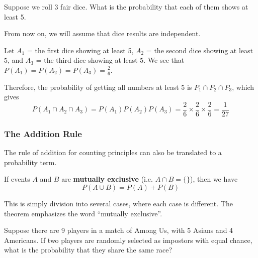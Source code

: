  
\begin{frame}[t]
\begin{ex} 
Suppose we roll 3 fair dice. What is the probability that each of them shows at least 5.
\end{ex} 
\begin{sol}
From now on, we will assume that dice results are independent.
\medskip
 
 Let $A_1$ = the first dice showing at least 5, $A_2$ = the second dice showing at least $5$, and $A_3$ = the third dice showing at least $5$. We see that $P(A_1) = P(A_2) = P(A_3) = \frac{2}{6}$. 

\medskip Therefore, the probability of getting all numbers at least 5 is $P_1 \cap P_2 \cap P_3$, which gives
\[P(A_1 \cap A_2 \cap A_3) = P(A_1) P(A_2) P(A_3) = \frac{2}{6} \times \frac{2}{6} \times \frac{2}{6} = \frac{1}{27}\]
\end{sol}
\end{frame}

\begin{frame}
\frametitle{The Addition Rule}
The rule of addition for counting principles can also be translated to a probability term.
\begin{thm}{}{}
If events $A$ and $B$ are \textbf{mutually exclusive} (i.e. $A \cap B = \{\}$), then we have
\begin{equation}
P(A \cup B) = P(A) + P(B)
\end{equation}
\end{thm}
This is simply division into several cases, where each case is different. The theorem emphasizes the word ``mutually exclusive''.
\end{frame}

 
\begin{frame}[t]
\begin{ex} 
Suppose there are 9 players in a match of Among Us, with 5 Asians and 4 Americans. If two players are randomly selected as impostors with equal chance, what is the probability that they share the same race?
\end{ex} 
\end{frame}


